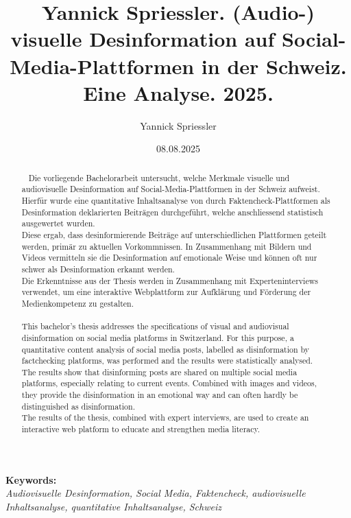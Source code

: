 \documentclass[12pt,a4paper]{article}        %
\title{Yannick Spriessler. (Audio-) visuelle Desinformation auf Social-Media-Plattformen in der Schweiz. Eine Analyse. 2025.}        %
\author{Yannick Spriessler}     %
\date{08.08.2025}     %
\begin{document}
\begin{titlingpage} %
  
  \nocite{howard_trees_2017}  %
\end{titlingpage}
\pagebreak      %
\setcounter{page}{1}    %

\renewcommand{\abstractname}{Abstract}
\begin{abstract}
  ~\label{abstract}
  Die vorliegende Bachelorarbeit untersucht, welche Merkmale visuelle und audiovisuelle Desinformation auf Social-Media-Plattformen in der Schweiz aufweist. Hierfür wurde eine quantitative Inhaltsanalyse von durch Faktencheck-Plattformen als Desinformation deklarierten Beiträgen durchgeführt, welche anschliessend statistisch ausgewertet wurden.\\
  Diese ergab, dass desinformierende Beiträge auf unterschiedlichen Plattformen geteilt werden, primär zu aktuellen Vorkommnissen. In Zusammenhang mit Bildern und Videos vermitteln sie die Desinformation auf emotionale Weise und können oft nur schwer als Desinformation erkannt werden.\\
  Die Erkenntnisse aus der Thesis werden in Zusammenhang mit Experteninterviews verwendet, um eine interaktive Webplattform zur Aufklärung und Förderung der Medienkompetenz zu gestalten.
  \\
  \\
  This bachelor's thesis addresses the specifications of visual and audiovisual disinformation on social media platforms in Switzerland. For this purpose, a quantitative content analysis of social media posts, labelled as disinformation by factchecking platforms, was performed and the results were statistically analysed.\\
  The results show that disinforming posts are shared on multiple social media platforms, especially relating to current events. Combined with images and videos, they provide the disinformation in an emotional way and can often hardly be distinguished as disinformation.\\
  The results of the thesis, combined with expert interviews, are used to create an interactive web platform to educate and strengthen media literacy.
\end{abstract}

\vfill
\textbf{Keywords:}\\ \textit{Audiovisuelle Desinformation, Social Media, Faktencheck, audiovisuelle Inhaltsanalyse, quantitative Inhaltsanalyse, Schweiz}
\end{document}

